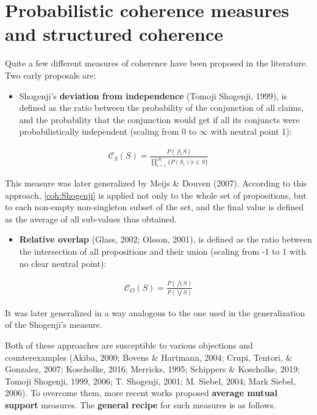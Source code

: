 \documentclass[
  10pt,
]{scrartcl}
\providecommand{\tightlist}{%
  \setlength{\itemsep}{0pt}\setlength{\parskip}{0pt}}
\begin{document}
\hypertarget{probabilistic-coherence-measures-and-structured-coherence}{%
\section{Probabilistic coherence measures and structured coherence}\label{probabilistic-coherence-measures-and-structured-coherence}}

\label{sec:measures}

Quite a few different measures of coherence have been proposed in the literature. Two early proposals are:

\begin{itemize}
\tightlist
\item
  Shogenji's
  \textbf{deviation from independence} (Tomoji Shogenji, 1999), is defined as the ratio between the probability of the
  conjunction of all claims, and the probability that the conjunction
  would get if all its conjuncts were probabilistically independent (scaling from 0 to \(\infty\) with neutral point 1):
\end{itemize}

\begin{align}
    \tag{Shogenji}
    \label{coh:Shogenji}
     \mathcal{C}_{S}(S)=\frac{P(\bigwedge S)}{\prod_{i=1}^{\vert S \vert}\{P(S_i)\vert i \in S\}}
\end{align}

\noindent This measure was later generalized by Meijs \& Douven (2007). According to this approach, \eqref{coh:Shogenji} is applied not only to the whole set of propositions, but to each non-empty non-singleton subset of the set, and the final value is defined as the average of all sub-values thus obtained.

\begin{itemize}
\tightlist
\item
  \textbf{Relative overlap} (Glass, 2002; Olsson, 2001), is defined as the ratio between the intersection of all propositions and their union (scaling from -1 to 1 with no clear neutral point):
\end{itemize}

\begin{align}
    \tag{Olsson}
    \label{coh:Olsson}
    \mathcal{C}_{O}(S)=\frac{P(\bigwedge S)}{P(\bigvee S)}
\end{align}

\noindent It was later generalized in a way analogous to the one used in the generalization of the Shogenji's measure.

Both of these approaches are susceptible to various objections and counterexamples (Akiba, 2000; Bovens \& Hartmann, 2004; Crupi, Tentori, \& Gonzalez, 2007; Koscholke, 2016; Merricks, 1995; Schippers \& Koscholke, 2019; Tomoji Shogenji, 1999, 2006; T. Shogenji, 2001; M. Siebel, 2004; Mark Siebel, 2006). To overcome them, more recent works proposed \textbf{average mutual support} measures. The \textbf{general recipe }for such measures is as follows.
\end{document}
